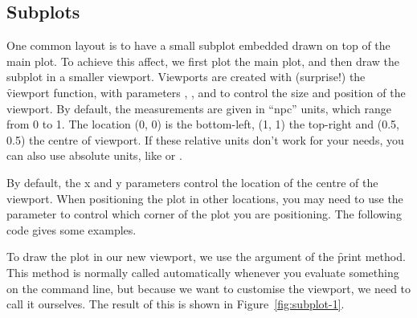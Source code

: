 % 


\subsection{Subplots}

One common layout is to have a small subplot embedded drawn on top of the main plot.  To achieve this affect, we first plot the main plot, and then draw the subplot in a smaller viewport.  Viewports are created with (surprise!) the \f{viewport} function, with parameters , ,  and  to control the size and position of the viewport. By default, the measurements are given in ``npc'' units, which range from 0 to 1. The location (0, 0) is the bottom-left, (1, 1) the top-right and (0.5, 0.5) the centre of viewport.  If these relative units don't work for your needs, you can also use absolute units, like  or .

% 
% 
% 


By default, the x and y parameters control the location of the centre of the viewport. When positioning the plot in other locations, you may need to use the  parameter to control which corner of the plot you are positioning.  The following code gives some examples.

% 


To draw the plot in our new viewport, we use the  argument of the  \f{print} method.  This method is normally called automatically whenever you evaluate something on the command line, but because we want to customise the viewport, we need to call it ourselves.  The result of this is shown in Figure~\ref{fig:subplot-1}.

